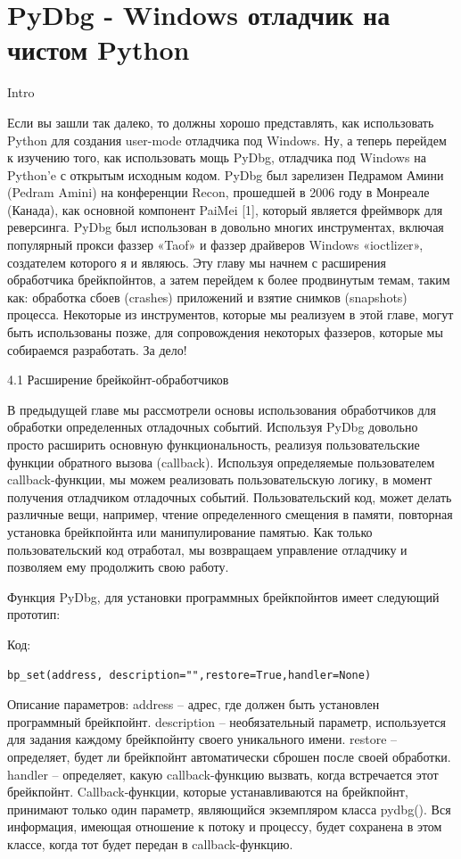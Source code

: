 \documentclass[12pt, a4paper, oneside]{book}
\begin{document}
\chapter{PyDbg - Windows отладчик на чистом Python}
Intro

Если вы зашли так далеко, то должны хорошо представлять, как использовать Python для создания user-mode отладчика под Windows. Ну, а теперь перейдем к изучению того, как использовать мощь PyDbg, отладчика под Windows на Python’e с открытым исходным кодом. PyDbg был зарелизен Педрамом Амини (Pedram Amini) на конференции Recon, прошедшей в 2006 году в Монреале (Канада), как основной компонент PaiMei [1], который является фреймворк для реверсинга. PyDbg был использован в довольно многих инструментах, включая популярный прокси фаззер «Taof» и фаззер драйверов Windows «ioctlizer», создателем которого я и являюсь. Эту главу мы начнем с расширения обработчика брейкпойнтов, а затем перейдем к более продвинутым темам, таким как: обработка сбоев (crashes) приложений и взятие снимков (snapshots) процесса. Некоторые из инструментов, которые мы реализуем в этой главе, могут быть использованы позже, для сопровождения некоторых фаззеров, которые мы собираемся разработать. За дело!


4.1 Расширение брейкойнт-обработчиков

В предыдущей главе мы рассмотрели основы использования обработчиков для обработки определенных отладочных событий. Используя PyDbg довольно просто расширить основную функциональность, реализуя пользовательские функции обратного вызова (callback). Используя определяемые пользователем callback-функции, мы можем реализовать пользовательскую логику, в момент получения отладчиком отладочных событий. Пользовательский код, может делать различные вещи, например, чтение определенного смещения в памяти, повторная установка брейкпойнта или манипулирование памятью. Как только пользовательский код отработал, мы возвращаем управление отладчику и позволяем ему продолжить свою работу.

Функция PyDbg, для установки программных брейкпойнтов имеет следующий прототип:

Код:
\begin{verbatim}
bp_set(address, description="",restore=True,handler=None)
\end{verbatim}
Описание параметров:
address – адрес, где должен быть установлен программный брейкпойнт.
description – необязательный параметр, используется для задания каждому брейкпойнту своего уникального имени.
restore – определяет, будет ли брейкпойнт автоматически сброшен после своей обработки.
handler – определяет, какую callback-функцию вызвать, когда встречается этот брейкпойнт. Callback-функции, которые устанавливаются на брейкпойнт, принимают только один параметр, являющийся экземпляром класса pydbg(). Вся информация, имеющая отношение к потоку и процессу, будет сохранена в этом классе, когда тот будет передан в callback-функцию.
\end{document}
